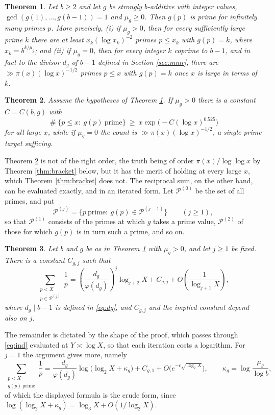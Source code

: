 \documentclass[11pt,reqno]{amsart}
\theoremstyle{plain}
\newtheorem{theorem}{Theorem}[section]
\theoremstyle{definition}
\DeclareMathOperator{\Card}{\#}
\begin{document}
\begin{theorem}\label{thm:main}
Let $b\ge 2$ and let $g$ be strongly $b$-additive with integer values, $\gcd(g(1),\dots,g(b-1))=1$ and $\mu_g\ge0$. Then $g(p)$ is prime for infinitely many primes $p$. More precisely, {\rm(i)} if $\mu_g>0$, then for every sufficiently large prime $k$ there are at least $x_k(\log x_k)^{-2}$ primes $p\le x_k$ with $g(p)=k$, where $x_k=b^{k/\mu_g}$; and {\rm(ii)} if $\mu_g=0$, then for every integer $k$ coprime to $b-1$, and in fact to the divisor $d_g$ of $b-1$ defined in Section \ref{sec:mmr}, there are $\gg\pi(x)(\log x)^{-1/2}$ primes $p\le x$ with $g(p)=k$ once $x$ is large in terms of $k$.
\end{theorem}

\begin{theorem}\label{thm:count}
Assume the hypotheses of Theorem \ref{thm:main}. If $\mu_g>0$ there is a constant $C=C(b,g)$ with
\[
\Card\{p\le x:\ g(p)\ \text{prime}\}\ \ge\ x\exp\big(-C(\log x)^{0.525}\big)
\]
for all large $x$, while if $\mu_g=0$ the count is $\gg\pi(x)(\log x)^{-1/2}$, a single prime target sufficing.
\end{theorem}

Theorem \ref{thm:count} is not of the right order, the truth being of order $\pi(x)/\log\log x$ by Theorem \ref{thm:bracket} below, but it has the merit of holding at every large $x$, which Theorem \ref{thm:bracket} does not. The reciprocal sum, on the other hand, can be evaluated exactly, and in an iterated form. Let $\mathcal P^{(0)}$ be the set of all primes, and put
\[
\mathcal P^{(j)}=\{p\ \text{prime}:\ g(p)\in\mathcal P^{(j-1)}\}\qquad(j\ge1),
\]
so that $\mathcal P^{(1)}$ consists of the primes at which $g$ takes a prime value, $\mathcal P^{(2)}$ of those for which $g(p)$ is in turn such a prime, and so on.

\begin{theorem}\label{thm:mertens}
Let $b$ and $g$ be as in Theorem \ref{thm:main} with $\mu_g>0$, and let $j\ge1$ be fixed. There is a constant $C_{g,j}$ such that
\[
\sum_{\substack{p<X\\ p\in\mathcal P^{(j)}}}\frac1p=\left(\frac{d_g}{\varphi(d_g)}\right)^{\!j}\log_{j+2}X+C_{g,j}+O\!\left(\frac{1}{\log_{j+1}X}\right),
\]
where $d_g\mid b-1$ is defined in \eqref{eq:dg}, and $C_{g,j}$ and the implied constant depend also on $j$.
\end{theorem}

The remainder is dictated by the shape of the proof, which passes through \eqref{eq:ind} evaluated at $Y\asymp\log X$, so that each iteration costs a logarithm. For $j=1$ the argument gives more, namely
\begin{equation}\label{eq:sharp}
\sum_{\substack{p<X\\ g(p)\ \text{prime}}}\frac1p=\frac{d_g}{\varphi(d_g)}\log\big(\log_2X+\kappa_g\big)+C_{g,1}+O\big(e^{-c\sqrt{\log_2X}}\big),\qquad \kappa_g=\log\frac{\mu_g}{\log b},
\end{equation}
of which the displayed formula is the crude form, since $\log(\log_2X+\kappa_g)=\log_3X+O(1/\log_2X)$.
\end{document}
